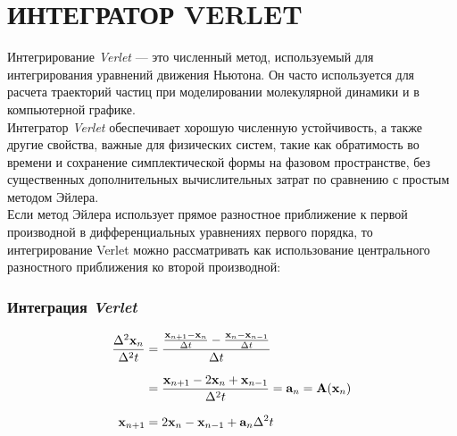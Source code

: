 \documentclass{article}
\begin{document}
\pagebreak
\section{ИНТЕГРАТОР VERLET}
Интегрирование \textit{Verlet} --- это численный метод, используемый для интегрирования уравнений движения Ньютона. Он часто используется для расчета траекторий частиц при моделировании молекулярной динамики и в компьютерной графике.\\
Интегратор \textit{Verlet} обеспечивает хорошую численную устойчивость, а также другие свойства, важные для физических систем, такие как обратимость во времени и сохранение симплектической формы на фазовом пространстве, без существенных дополнительных вычислительных затрат по сравнению с простым методом Эйлера.\\
Если метод Эйлера использует прямое разностное приближение к первой производной в дифференциальных уравнениях первого порядка, то интегрирование Verlet можно рассматривать как использование центрального разностного приближения ко второй производной:\\
\subsubsection*{Интеграция \textit{Verlet}}
\begin{align*}
  \frac{\Delta^2\mathbf{x}_n}{\Delta^2 t} &= \frac{\frac{\mathbf{x}_{n + 1} - \mathbf{x}_n}{\Delta t} - \frac{\mathbf{x}_n - \mathbf{x}_{n - 1}}{\Delta t}}{\Delta t}\\[0.5\baselineskip]
                                          &= \frac{\mathbf{x}_{n + 1} - 2\mathbf{x}_n + \mathbf{x}_{n - 1}}{\Delta^2 t} = \mathbf{a}_n = \mathbf{A}(\mathbf{x}_n)\\[0.5\baselineskip]
  \mathbf{x}_{n + 1} &= 2\mathbf{x}_n - \mathbf{x}_{n - 1} + \mathbf{a}_n\Delta^2t
\end{align*}
\end{document}
